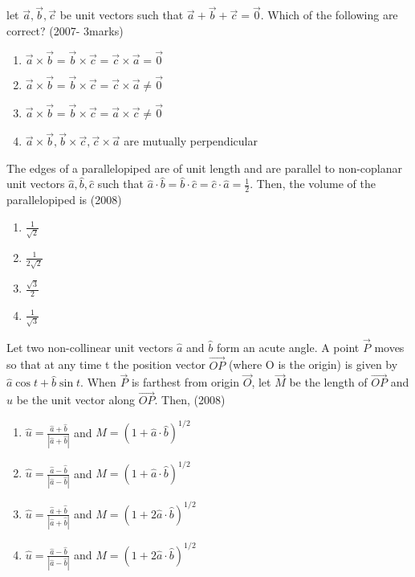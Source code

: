     \item let $\vec{a},\vec{b},\vec{c}$ be unit vectors such that $\vec{a}+\vec{b}+\vec{c}=\vec{0}$. Which of the following are correct?
    \hfill{(2007- 3marks)}
    \begin{enumerate}
    \item $\vec{a} \times \vec{b} = \vec{b} \times \vec{c} = \vec{c} \times \vec{a} = \vec{0}$
    \item $\vec{a} \times \vec{b} = \vec{b} \times \vec{c} = \vec{c} \times \vec{a} \neq \vec{0}$
    \item $\vec{a} \times \vec{b} = \vec{b} \times \vec{c} = \vec{a} \times \vec{c} \neq \vec{0}$
    \item $\vec{a} \times \vec{b}, \vec{b} \times \vec{c}, \vec{c} \times \vec{a}$ are mutually perpendicular
    \end{enumerate}
    \item The edges of a parallelopiped are of unit length and are parallel to non-coplanar unit vectors $\hat{a},\hat{b},\hat{c}$ such that $\hat{a} \cdot \hat{b}= \hat{b} \cdot \hat{c}= \hat{c} \cdot \hat{a}= \frac{1}{2}$. Then, the volume of the parallelopiped is 
    \hfill{(2008)}
    \begin{multicols}{2}
    \begin{enumerate}
    \item $\frac{1}{\sqrt{2}}$
    \item $\frac{1}{2\sqrt{2}}$
    \item $\frac{\sqrt{3}}{2}$
    \item $\frac{1}{\sqrt{3}}$
    \end{enumerate}
    \end{multicols}
    \item Let two non-collinear unit vectors $\hat{a}$ and $\hat{b}$ form an acute angle. A point $\vec{P}$ moves so that at any time t the position vector $\overrightarrow{OP}$ (where O is the origin) is given by $\hat{a}\cos{t} + \hat{b}\sin{t}$. When $\vec{P}$ is farthest from origin $\vec{O}$, let $\vec{M}$ be the length of $\overrightarrow{OP}$ and $\hat{u}$ be the unit vector along $\overrightarrow{OP}$. Then,
    \hfill{(2008)}
    \begin{enumerate}
    \item $\hat{u} = \frac{\hat{a}+\hat{b}}{|\hat{a}+\hat{b}|}$  and $M = (1+\hat{a} \cdot \hat{b})^{1/2}$
    \item $\hat{u} = \frac{\hat{a}-\hat{b}}{|\hat{a}-\hat{b}|}$  and $M = (1+\hat{a} \cdot \hat{b})^{1/2}$
    \item $\hat{u} = \frac{\hat{a}+\hat{b}}{|\hat{a}+\hat{b}|}$  and $M = (1+2\hat{a} \cdot \hat{b})^{1/2}$
    \item $\hat{u} = \frac{\hat{a}-\hat{b}}{|\hat{a}-\hat{b}|}$  and $M = (1+2\hat{a} \cdot \hat{b})^{1/2}$
    \end{enumerate}
